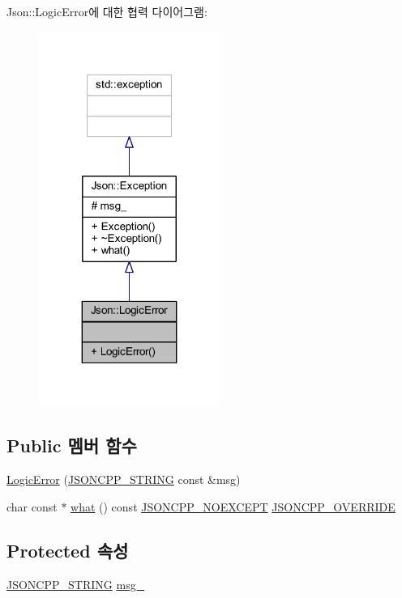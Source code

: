 Json\+:\+:Logic\+Error에 대한 협력 다이어그램\+:\nopagebreak
\begin{figure}[H]
\begin{center}
\leavevmode
\includegraphics[width=167pt]{class_json_1_1_logic_error__coll__graph}
\end{center}
\end{figure}
\subsection*{Public 멤버 함수}
\begin{DoxyCompactItemize}
\item 
\hyperlink{class_json_1_1_logic_error_acca679aa49768a4a1de7b705c67c2919}{Logic\+Error} (\hyperlink{json_8h_a1e723f95759de062585bc4a8fd3fa4be}{J\+S\+O\+N\+C\+P\+P\+\_\+\+S\+T\+R\+I\+NG} const \&msg)
\item 
char const  $\ast$ \hyperlink{class_json_1_1_exception_a70b7ce35e761fb93e8cd338e04619cd6}{what} () const \hyperlink{json_8h_af8418c6d82d9de6e5f3c739fcf2fe88d}{J\+S\+O\+N\+C\+P\+P\+\_\+\+N\+O\+E\+X\+C\+E\+PT} \hyperlink{json_8h_a824d6199c91488107e443226fa6022c5}{J\+S\+O\+N\+C\+P\+P\+\_\+\+O\+V\+E\+R\+R\+I\+DE}
\end{DoxyCompactItemize}
\subsection*{Protected 속성}
\begin{DoxyCompactItemize}
\item 
\hyperlink{json_8h_a1e723f95759de062585bc4a8fd3fa4be}{J\+S\+O\+N\+C\+P\+P\+\_\+\+S\+T\+R\+I\+NG} \hyperlink{class_json_1_1_exception_aae3cbb8b45bf21480f64502a8329659f}{msg\+\_\+}
\end{DoxyCompactItemize}


